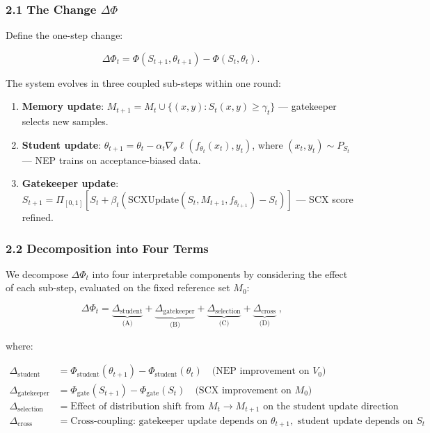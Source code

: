 \documentclass[
  12pt,
]{ctexart}
\providecommand{\tightlist}{%
  \setlength{\itemsep}{0pt}\setlength{\parskip}{0pt}}
\begin{document}
\subsubsection{\texorpdfstring{2.1 The Change
\(\Delta\Phi\)}{2.1 The Change \textbackslash Delta\textbackslash Phi}}\label{the-change-deltaphi}

Define the one-step change:

\[\Delta\Phi_t = \Phi(S_{t+1}, \theta_{t+1}) - \Phi(S_t, \theta_t).\]

The system evolves in three coupled sub-steps within one round:

\begin{enumerate}
\def\labelenumi{\arabic{enumi}.}
\tightlist
\item
  \textbf{Memory update}:
  \(M_{t+1} = M_t \cup \{(x,y) : S_t(x,y) \geq \gamma_t\}\) ---
  gatekeeper selects new samples.
\item
  \textbf{Student update}:
  \(\theta_{t+1} = \theta_t - \alpha_t \nabla_\theta \ell(f_{\theta_t}(x_t), y_t)\),
  where \((x_t, y_t) \sim P_{S_t}\) --- NEP trains on acceptance-biased
  data.
\item
  \textbf{Gatekeeper update}:
  \(S_{t+1} = \Pi_{[0,1]}[S_t + \beta_t (\text{SCXUpdate}(S_t, M_{t+1}, f_{\theta_{t+1}}) - S_t)]\)
  --- SCX score refined.
\end{enumerate}

\subsubsection{2.2 Decomposition into Four
Terms}\label{decomposition-into-four-terms}

We decompose \(\Delta\Phi_t\) into four interpretable components by
considering the effect of each sub-step, evaluated on the fixed
reference set \(M_0\):

\[\boxed{\;\Delta\Phi_t = \underbrace{\Delta_{\text{student}}}_{\text{(A)}} + \underbrace{\Delta_{\text{gatekeeper}}}_{\text{(B)}} + \underbrace{\Delta_{\text{selection}}}_{\text{(C)}} + \underbrace{\Delta_{\text{cross}}}_{\text{(D)}}\;},\]

where:

\[\begin{aligned}
\Delta_{\text{student}} &= \Phi_{\text{student}}(\theta_{t+1}) - \Phi_{\text{student}}(\theta_t) \quad \text{(NEP improvement on } V_0 \text{)} \\[4pt]
\Delta_{\text{gatekeeper}} &= \Phi_{\text{gate}}(S_{t+1}) - \Phi_{\text{gate}}(S_t) \quad \text{(SCX improvement on } M_0 \text{)} \\[4pt]
\Delta_{\text{selection}} &= \text{Effect of distribution shift from } M_t \to M_{t+1} \text{ on the student update direction} \\[4pt]
\Delta_{\text{cross}} &= \text{Cross-coupling: gatekeeper update depends on } \theta_{t+1}, \text{ student update depends on } S_t
\end{aligned}\]
\end{document}
